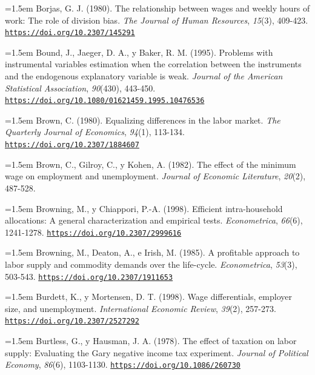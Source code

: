 \documentclass[10pt,a4paper]{article}
\begin{document}
\noindent\hangindent=1.5em Borjas, G. J. (1980). The relationship between wages and weekly hours of work: The role of division bias. \textit{The Journal of Human Resources}, \textit{15}(3), 409-423. \href{https://doi.org/10.2307/145291}{\nolinkurl{https://doi.org/10.2307/145291}}

\noindent\hangindent=1.5em Bound, J., Jaeger, D. A., y Baker, R. M. (1995). Problems with instrumental variables estimation when the correlation between the instruments and the endogenous explanatory variable is weak. \textit{Journal of the American Statistical Association}, \textit{90}(430), 443-450. \href{https://doi.org/10.1080/01621459.1995.10476536}{\nolinkurl{https://doi.org/10.1080/01621459.1995.10476536}}

\noindent\hangindent=1.5em Brown, C. (1980). Equalizing differences in the labor market. \textit{The Quarterly Journal of Economics}, \textit{94}(1), 113-134. \href{https://doi.org/10.2307/1884607}{\nolinkurl{https://doi.org/10.2307/1884607}}

\noindent\hangindent=1.5em Brown, C., Gilroy, C., y Kohen, A. (1982). The effect of the minimum wage on employment and unemployment. \textit{Journal of Economic Literature}, \textit{20}(2), 487-528.

\noindent\hangindent=1.5em Browning, M., y Chiappori, P.-A. (1998). Efficient intra-household allocations: A general characterization and empirical tests. \textit{Econometrica}, \textit{66}(6), 1241-1278. \href{https://doi.org/10.2307/2999616}{\nolinkurl{https://doi.org/10.2307/2999616}}

\noindent\hangindent=1.5em Browning, M., Deaton, A., e Irish, M. (1985). A profitable approach to labor supply and commodity demands over the life-cycle. \textit{Econometrica}, \textit{53}(3), 503-543. \href{https://doi.org/10.2307/1911653}{\nolinkurl{https://doi.org/10.2307/1911653}}

\noindent\hangindent=1.5em Burdett, K., y Mortensen, D. T. (1998). Wage differentials, employer size, and unemployment. \textit{International Economic Review}, \textit{39}(2), 257-273. \href{https://doi.org/10.2307/2527292}{\nolinkurl{https://doi.org/10.2307/2527292}}

\noindent\hangindent=1.5em Burtless, G., y Hausman, J. A. (1978). The effect of taxation on labor supply: Evaluating the Gary negative income tax experiment. \textit{Journal of Political Economy}, \textit{86}(6), 1103-1130. \href{https://doi.org/10.1086/260730}{\nolinkurl{https://doi.org/10.1086/260730}}
\end{document}
